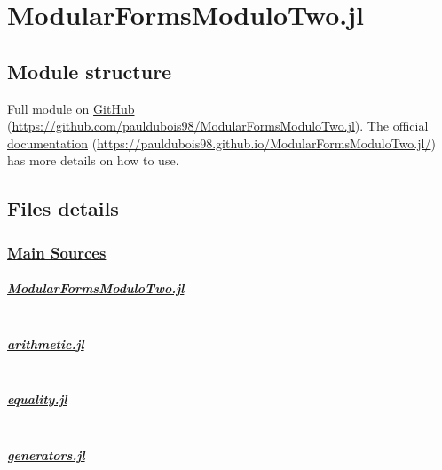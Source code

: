 \section{ModularFormsModuloTwo.jl}
\subsection[Files Tree]{Module structure}
Full module on \href{https://github.com/pauldubois98/ModularFormsModuloTwo.jl}{GitHub} (\url{https://github.com/pauldubois98/ModularFormsModuloTwo.jl}).
The official \href{https://pauldubois98.github.io/ModularFormsModuloTwo.jl/}{documentation} (\url{https://pauldubois98.github.io/ModularFormsModuloTwo.jl/}) has more details on how to use.

\subsection{Files details}

\subsubsection[Main Sources] {\href{https://github.com/pauldubois98/ModularFormsModuloTwo.jl/tree/master/src}{Main Sources}}
\subparagraph{\href{https://github.com/pauldubois98/ModularFormsModuloTwo.jl/blob/master/src/ModularFormsModuloTwo.jl}{ModularFormsModuloTwo.jl}}
\label{code:ModularFormsModuloTwo}
\inputminted[breaklines]{julia}{Module/ModularFormsModuloTwo.jl}

\subparagraph{\href{https://github.com/pauldubois98/ModularFormsModuloTwo.jl/blob/master/src/arithmetic.jl}{arithmetic.jl}}
\label{code:arithmetic}
\inputminted[breaklines]{julia}{Module/arithmetic.jl}

\subparagraph{\href{https://github.com/pauldubois98/ModularFormsModuloTwo.jl/blob/master/src/equality.jl}{equality.jl}}
\label{code:equality}
\inputminted[breaklines]{julia}{Module/equality.jl}

\subparagraph{\href{https://github.com/pauldubois98/ModularFormsModuloTwo.jl/blob/master/src/generators.jl}{generators.jl}}
\label{code:generators}
\inputminted[breaklines]{julia}{Module/generators.jl}

